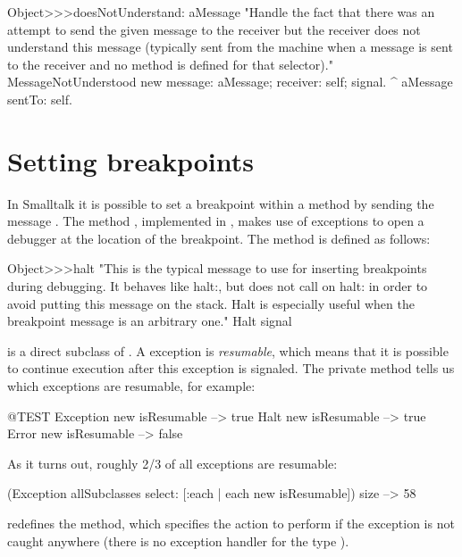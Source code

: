 \documentclass[a4paper,10pt,twoside]{book}
\begin{document}
\begin{code}{}
Object>>>doesNotUnderstand: aMessage 
	 "Handle the fact that there was an attempt to send the given message to the receiver but the receiver does not understand this message (typically sent from the machine when a message is sent to the receiver and no method is defined for that selector)."
	MessageNotUnderstood new 
		message: aMessage;
		receiver: self;
		signal.
	^ aMessage sentTo: self.
\end{code}

\section{Setting breakpoints}

In Smalltalk it is possible to set a breakpoint within a method by sending the message . The method , implemented in , makes use of exceptions to open a debugger at the location of the breakpoint.
The method  is defined as follows:

\begin{code}{}
Object>>>halt
	"This is the typical message to use for inserting breakpoints during 
	debugging. It behaves like halt:, but does not call on halt: in order to 
	avoid putting this message on the stack. Halt is especially useful when 
	the breakpoint message is an arbitrary one."
	Halt signal
\end{code}

 is a direct subclass of . A  exception is \emph{resumable}, which means that it is possible to continue execution after this exception is signaled. The private  method  tells us which exceptions are resumable, for example:
\begin{code}{@TEST}
Exception new isResumable --> true
Halt new isResumable          --> true
Error new isResumable         --> false
\end{code}

As it turns out, roughly 2/3 of all exceptions are resumable:
\begin{code}{}
(Exception allSubclasses select: [:each | each new isResumable]) size --> 58
\end{code}

 redefines the  method, which specifies the action to perform if the exception is not caught anywhere (\ie there is no exception handler for the type ).
\end{document}

